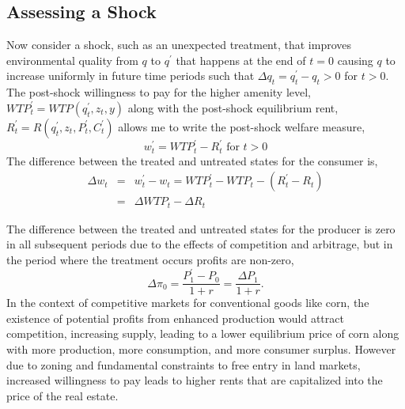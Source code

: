 \documentclass[ecta,nameyear,draft]{econsocart}
\theoremstyle{plain}
\theoremstyle{remark}
\begin{document}
\subsection{Assessing a Shock}
Now consider a shock, such as an unexpected treatment, that improves environmental quality from $q$ to $q^\prime$ that happens at the end of $t=0$ causing $q$ to increase uniformly in future time periods such that $\Delta q_t=q^\prime_t-q_t>0$ for $t>0$.
The post-shock willingness to pay for the higher amenity level,$\mathit{WTP}^\prime_t=\mathit{WTP}(q^\prime_t,z_t,y)$ along with the post-shock equilibrium rent, $R^\prime_t=R(q^\prime_t,z_t,P^\prime_t,C^\prime_t)$ allows me to write the post-shock welfare measure,
\begin{equation*}
	w^\prime_t=\mathit{WTP}^\prime_t-R^\prime_t \text{ for } t>0
\end{equation*}
The difference between the treated and untreated states for the consumer is,
\begin{eqnarray*}
	\Delta w_t&=&w^\prime_t-w_t=\mathit{WTP}^\prime_t-\mathit{WTP}_t-(R^\prime_t-R_t)\\
	&=&\Delta\mathit{WTP}_t-\Delta R_t
\end{eqnarray*}

The difference between the treated and untreated states for the producer is zero in all subsequent periods due to the effects of competition and arbitrage, but in the period where the treatment occurs profits are non-zero,
\begin{equation}
	\Delta\pi_0=\frac{P^\prime_1-P_0}{1+r}=\frac{\Delta P_1}{1+r}.\label{pitzero}
\end{equation}
In the context of competitive markets for conventional goods like corn, the existence of potential profits from enhanced production would attract competition, increasing supply, leading to a lower equilibrium price of corn along with more production, more consumption, and more consumer surplus. However due to zoning and fundamental constraints to free entry in land markets, increased willingness to pay leads to higher rents that are capitalized into the price of the real estate. 
\end{document}
